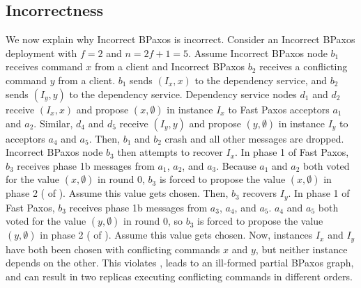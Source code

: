\subsection{Incorrectness}
We now explain why Incorrect BPaxos is incorrect. Consider an Incorrect BPaxos
deployment with $f = 2$ and $n = 2f + 1 = 5$.
%
Assume Incorrect BPaxos node $b_1$ receives command $x$ from a client and
Incorrect BPaxos $b_2$ receives a conflicting command $y$ from a client. $b_1$
sends $(I_x, x)$ to the dependency service, and $b_2$ sends $(I_y, y)$ to the
dependency service. Dependency service nodes $d_1$ and $d_2$ receive $(I_x, x)$
and propose $(x, \emptyset)$ in instance $I_x$ to Fast Paxos acceptors $a_1$
and $a_2$. Similar, $d_4$ and $d_5$ receive $(I_y, y)$ and propose $(y,
\emptyset)$ in instance $I_y$ to acceptors $a_4$ and $a_5$. Then, $b_1$ and
$b_2$ crash and all other messages are dropped. Incorrect BPaxos node $b_3$
then attempts to recover $I_x$. In phase 1 of Fast Paxos, $b_3$ receives phase
1b messages from $a_1$, $a_2$, and $a_3$. Because $a_1$ and $a_2$ both voted
for the value $(x, \emptyset{})$ in round $0$, $b_3$ is forced to propose the
value $(x, \emptyset)$ in phase 2 ( of
). Assume this value gets chosen. Then, $b_3$ recovers
$I_y$. In phase 1 of Fast Paxos, $b_3$ receives phase 1b messages from $a_3$,
$a_4$, and $a_5$. $a_4$ and $a_5$ both voted for the value $(y, \emptyset{})$
in round $0$, so $b_3$ is forced to propose the value $(y, \emptyset)$ in phase
2 ( of ). Assume this value gets
chosen. Now, instances $I_x$ and $I_y$ have both been chosen with conflicting
commands $x$ and $y$, but neither instance depends on the other. This violates
, leads to an ill-formed partial BPaxos graph, and
can result in two replicas executing conflicting commands in different orders.


